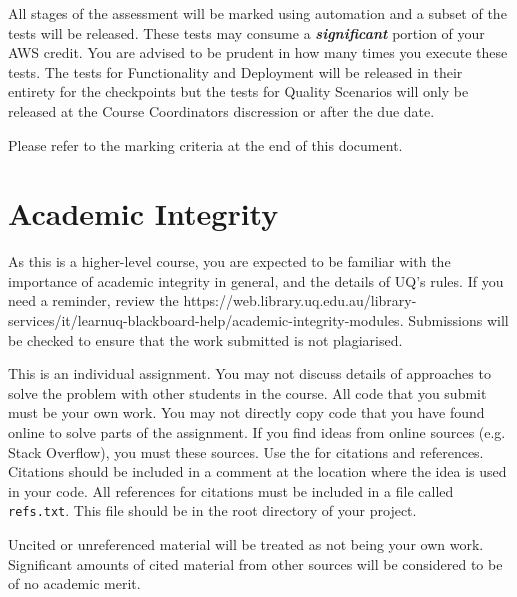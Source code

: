 \documentclass{csse4400}
\begin{document}
All stages of the assessment will be marked using automation and a subset of the tests will be released. These tests may consume a \textbf{\emph{significant}} portion of your AWS credit. You are advised to be prudent in how many times you execute these tests. The tests for Functionality and Deployment will be released in their entirety for the checkpoints but the tests for Quality Scenarios will only be released at the Course Coordinators discression or after the due date.

Please refer to the marking criteria at the end of this document.

\section{Academic Integrity}
As this is a higher-level course, you are expected to be familiar with the importance of academic integrity in general, and the details of UQ's rules. If you need a reminder, review the  {https://web.library.uq.edu.au/library-services/it/learnuq-blackboard-help/academic-integrity-modules}. Submissions will be checked to ensure that the work submitted is not plagiarised.

This is an individual assignment. You may not discuss details of approaches to solve the problem with other students in the course. All code that you submit must be your own work. You may not directly copy code that you have found online to solve parts of the assignment. If you find ideas from online sources (e.g. Stack Overflow), you must  these sources. Use the  for citations and references. Citations should be included in a comment at the location where the idea is used in your code. All references for citations must be included in a file called \texttt{refs.txt}. This file should be in the root directory of your project.

Uncited or unreferenced material will be treated as not being your own work. Significant amounts of cited material from other sources will be considered to be of no academic merit.






\end{document}
